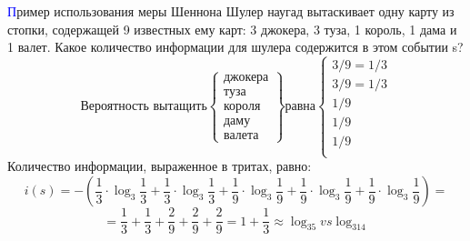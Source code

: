 \begin{frame}[t]{\textcolor{blue}{П}ример использования меры Шеннона}
	\noindent Шулер наугад вытаскивает одну карту из стопки, содержащей 9 известных ему карт: 3 джокера, 3 туза, 1 король, 1 дама и 1 валет. Какое количество информации для шулера содержится в этом событии s?
	$$\mbox{Вероятность вытащить} \left\{
	\begin{array}{l}
		\mbox{джокера}\\
		\mbox{туза}\\
		\mbox{короля}\\
		\mbox{даму}\\
		\mbox{валета}
	\end{array}
	\right\}\mbox{равна}\left\{
	\begin{array}{l}
		3/9=1/3\\
		3/9=1/3\\
		1/9\\
		1/9\\
		1/9\\
	\end{array}	
	\right .$$
	Количество информации, выраженное в тритах, равно:
		$$i(s)=-\left(\frac{1}{3}\cdot\log_3\frac{1}{3}+\frac{1}{3}\cdot\log_3\frac{1}{3}+\frac{1}{9}\cdot\log_3\frac{1}{9}+\frac{1}{9}\cdot\log_3\frac{1}{9}+\frac{1}{9}\cdot\log_3\frac{1}{9}\right)=$$
		$$=\frac{1}{3}+\frac{1}{3}+\frac{2}{9}+\frac{2}{9}+\frac{2}{9}=1+\frac{1}{3}\approx\log_35vs\log_314$$
\end{frame}